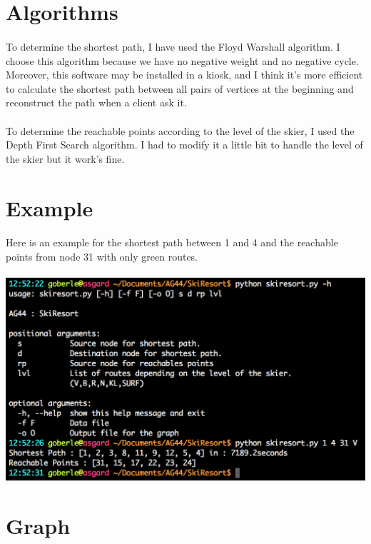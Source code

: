 \documentclass{article}
\begin{document}
\section{Algorithms}
    \paragraph{}
        To determine the shortest path, I have used the Floyd Warshall algorithm. I choose this algorithm because we have no negative weight and no negative cycle. Moreover, this software may be installed in a kiosk, and I think it's more efficient to calculate the shortest path between all pairs of vertices at the beginning and reconstruct the path when a client ask it.
    \paragraph{}
        To determine the reachable points according to the level of the skier, I used the Depth First Search algorithm. I had to modify it a little bit to handle the level of the skier but it work's fine. 
\newpage{}
\section{Example}
    \paragraph{}
        Here is an example for the shortest path between 1 and 4 and the reachable points from node 31 with only green routes.
    \paragraph{}
        \includegraphics[scale=0.60]{example.png}

\section{Graph}
\end{document}
